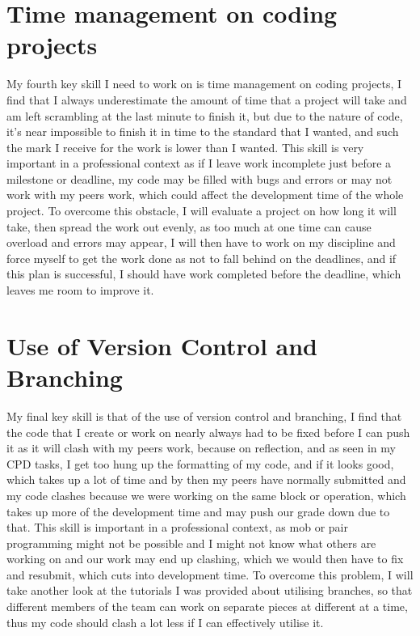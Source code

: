 \documentclass{scrartcl}
\begin{document}
\section{Time management on coding projects}

My fourth key skill I need to work on is time management on coding projects, I find that I always underestimate the amount of time that a project will take and am left scrambling at the last minute to finish it, but due to the nature of code, it's near impossible to finish it in time to the standard that I wanted, and such the mark I receive for the work is lower than I wanted. This skill is very important in a professional context as if I leave work incomplete just before a milestone or deadline, my code may be filled with bugs and errors or may not work with my peers work, which could affect the development time of the whole project. To overcome this obstacle, I will evaluate a project on how long it will take, then spread the work out evenly, as too much at one time can cause overload and errors may appear, I will then have to work on my discipline and force myself to get the work done as not to fall behind on the deadlines, and if this plan is successful, I should have work completed before the deadline, which leaves me room to improve it. 



\section{Use of Version Control and Branching}

My final key skill is that of the use of version control and branching, I find that the code that I create or work on nearly always had to be fixed before I can push it as it will clash with my peers work, because on reflection, and as seen in my CPD tasks, I get too hung up the formatting of my code, and if it looks good, which takes up a lot of time and by then my peers have normally submitted and my code clashes because we were working on the same block or operation, which takes up more of the development time and may push our grade down due to that. This skill is important in a professional context, as mob or pair programming might not be possible and I might not know what others are working on and our work may end up clashing, which we would then have to fix and resubmit, which cuts into development time. To overcome this problem, I will take another look at the tutorials I was provided about utilising branches, so that different members of the team can work on separate pieces at different at a time, thus my code should clash a lot less if I can effectively utilise it. 
\end{document}
